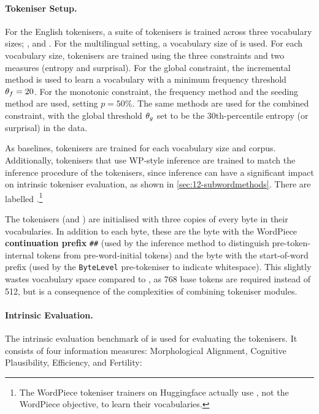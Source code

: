 \paragraph{Tokeniser Setup.} 
For the English tokenisers, a suite of tokenisers is trained across three vocabulary sizes; ,  and . For the multilingual setting, a vocabulary size of  is used. For each vocabulary size, tokenisers are trained using the three constraints and two measures (entropy and surprisal). For the global constraint, the incremental method is used to learn a vocabulary with a minimum frequency threshold $\theta_f = 20$. For the monotonic constraint, the frequency method and the seeding method are used, setting $p=50\%$. The same methods are used for the combined constraint, with the global threshold $\theta_g$ set to be the 30th-percentile entropy (or surprisal) in the data.

As baselines, \bpe tokenisers are trained for each vocabulary size and corpus. Additionally, \bpe tokenisers that use WP-style inference are trained to match the inference procedure of the \bytespan tokenisers, since inference can have a significant impact on intrinsic tokeniser evaluation, as shown in \cref{sec:12-subwordmethods}. There are labelled \bpewp.\footnote{The WordPiece tokeniser trainers on Huggingface actually use \bpe, not the WordPiece objective, to learn their vocabularies.}

The \bytespan tokenisers (and \bpewp) are initialised with three copies of every byte in their vocabularies. In addition to each byte, these are the byte with the WordPiece \textbf{continuation prefix} \texttt{\#\#} (used by the inference method to distinguish pre-token-internal tokens from pre-word-initial tokens) and the byte with the start-of-word prefix (used by the \texttt{ByteLevel} pre-tokeniser to indicate whitespace). This slightly wastes vocabulary space compared to \bpe, as 768 base tokens are required instead of 512, but is a consequence of the complexities of combining tokeniser modules.

\paragraph{Intrinsic Evaluation.} 

The intrinsic evaluation benchmark of \citet{uzan-etal-2024-greed} is used for evaluating the tokenisers. It consists of four information measures: Morphological Alignment, Cognitive Plausibility, \renyi Efficiency, and Fertility:

